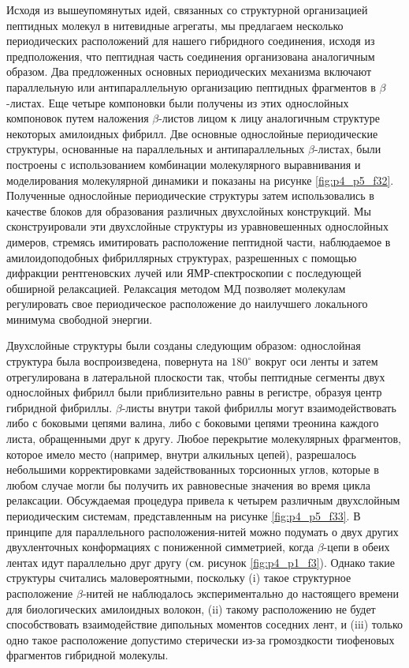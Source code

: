     Исходя из вышеупомянутых идей, связанных со структурной организацией пептидных молекул в нитевидные агрегаты, мы предлагаем несколько периодических расположений для нашего гибридного соединения, исходя из предположения, что пептидная часть соединения организована аналогичным образом. Два предложенных основных периодических механизма включают параллельную или антипараллельную организацию пептидных фрагментов в $\beta$-листах. Еще четыре компоновки были получены из этих однослойных компоновок путем наложения $\beta$-листов лицом к лицу аналогичным структуре некоторых амилоидных фибрилл. Две основные однослойные периодические структуры, основанные на параллельных и антипараллельных $\beta$-листах, были построены с использованием комбинации молекулярного выравнивания и моделирования молекулярной динамики и показаны на рисунке \ref{fig:p4_p5_f32}. Полученные однослойные периодические структуры затем использовались в качестве блоков для образования различных двухслойных конструкций. Мы сконструировали эти двухслойные структуры из уравновешенных однослойных димеров, стремясь имитировать расположение пептидной части, наблюдаемое в амилоидоподобных фибриллярных структурах, разрешенных с помощью дифракции рентгеновских лучей или ЯМР-спектроскопии \cite{nelson_structure_2005,luhrs_3d_2005} с последующей обширной релаксацией. Релаксация методом МД позволяет молекулам регулировать свое периодическое расположение до наилучшего локального минимума свободной энергии.

    Двухслойные структуры были созданы следующим образом: однослойная структура была воспроизведена, повернута на $180^{\circ}$ вокруг оси ленты и затем отрегулирована в латеральной плоскости так, чтобы пептидные сегменты двух однослойных фибрилл были приблизительно равны в регистре, образуя центр гибридной фибриллы. $\beta$-листы внутри такой фибриллы могут взаимодействовать либо с боковыми цепями валина, либо с боковыми цепями треонина каждого листа, обращенными друг к другу. Любое перекрытие молекулярных фрагментов, которое имело место (например, внутри алкильных цепей), разрешалось небольшими корректировками задействованных торсионных углов, которые в любом случае могли бы получить их равновесные значения во время цикла релаксации. Обсуждаемая процедура привела к четырем различным двухслойным периодическим системам, представленным на рисунке \ref{fig:p4_p5_f33}. В принципе для параллельного расположения-нитей можно подумать о двух других двухленточных конформациях с пониженной симметрией, когда $\beta$-цепи в обеих лентах идут параллельно друг другу (см. рисунок \ref{fig:p4_p1_f3}). Однако такие структуры считались маловероятными, поскольку (i) такое структурное расположение $\beta$-нитей не наблюдалось экспериментально до настоящего времени для биологических амилоидных волокон, (ii) такому расположению не будет способствовать взаимодействие дипольных моментов соседних лент, и (iii) только одно такое расположение допустимо стерически из-за громоздкости тиофеновых фрагментов гибридной молекулы.

